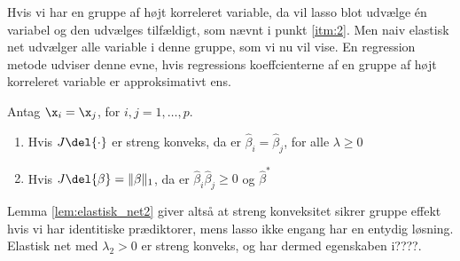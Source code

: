 %
Hvis vi har en gruppe af højt korreleret variable, da vil lasso blot udvælge én variabel og den udvælges tilfældigt, som nævnt i punkt \ref{itm:2}.
Men naiv elastisk net udvælger alle variable i denne gruppe, som vi nu vil vise. 
En regression metode udviser denne evne, hvis regressions koeffcienterne af en gruppe af højt korreleret variable er approksimativt ens.
%
\begin{lem} \label{lem:elastisk_net2}
Antag \(\x_i = \x_j\), for \(i, j = 1, \ldots, p\).
\begin{enumerate}[label=\alph*)]
\item Hvis \(J \del{\cdot}\) er streng konveks, da er \(\hat{\beta}_i = \hat{\beta}_j\), for alle \(\lambda \geq 0\)
\item Hvis \(J \del{\beta} = \Vert \beta \Vert_1\), da er \(\hat{\beta}_i \hat{\beta}_j \geq 0\) og \(\hat{\beta}^*\) 
\end{enumerate}
\end{lem}
%
Lemma \ref{lem:elastisk_net2} giver altså at streng konveksitet sikrer gruppe effekt hvis vi har identitiske prædiktorer, mens lasso ikke engang har en entydig løsning.
Elastisk net med \(\lambda_2 > 0\) er streng konveks, og har dermed egenskaben i????.


